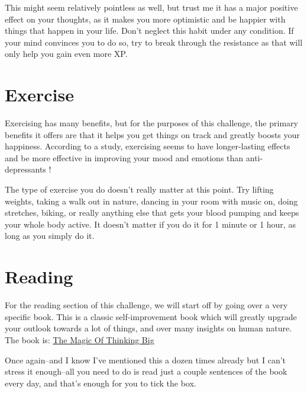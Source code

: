 \documentclass[
]{book}
\begin{document}
This might seem relatively pointless as well, but trust me it has a major positive effect on your thoughts, as it makes you more optimistic and be happier with things that happen in your life. Don't neglect this habit under any condition. If your mind convinces you to do so, try to break through the resistance as that will only help you gain even more XP.

\hypertarget{exercise}{%
\section{Exercise}\label{exercise}}

Exercising has many benefits, but for the purposes of this challenge, the primary benefits it offers are that it helps you get things on track and greatly boosts your happiness. According to a study, exercising seems to have longer-lasting effects and be more effective in improving your mood and emotions than anti-depressants \citep{exercise}!

The type of exercise you do doesn't really matter at this point. Try lifting weights, taking a walk out in nature, dancing in your room with music on, doing stretches, biking, or really anything else that gets your blood pumping and keeps your whole body active. It doesn't matter if you do it for 1 minute or 1 hour, as long as you simply do it.

\hypertarget{reading}{%
\section{Reading}\label{reading}}

For the reading section of this challenge, we will start off by going over a very specific book. This is a classic self-improvement book which will greatly upgrade your outlook towards a lot of things, and over many insights on human nature. The book is: \href{https://www.google.com/url?sa=t\&rct=j\&q=\&esrc=s\&source=web\&cd=\&ved=2ahUKEwjj9uXHgJqAAxXPM0QIHYboCTEQFnoECBEQAQ\&url=https\%3A\%2F\%2Fwww.researchgate.net\%2Fprofile\%2FRzger-Abdula\%2Fpost\%2FWhat_leadership_books_can_you_recommend_for_me\%2Fattachment\%2F5bae7b2fcfe4a76455f6c7c2\%2FAS\%253A675912282550277\%25401538161454808\%2Fdownload\%2FThe\%2BMagic\%2Bof\%2BThinking\%2BBig.pdf\&usg=AOvVaw0qdaTKW3aTys7FGpy8x7F3\&opi=89978449}{The Magic Of Thinking Big}

Once again--and I know I've mentioned this a dozen times already but I can't stress it enough--all you need to do is read just a couple sentences of the book every day, and that's enough for you to tick the box.
\end{document}
